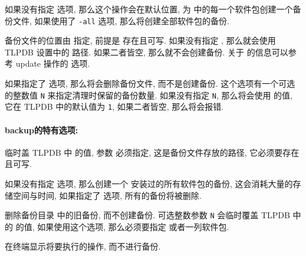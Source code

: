 如果没有指定  选项, 那么这个操作会在默认位置, 为  中的每一个软件包创建一个备份文件, 如果使用了 \texttt{-all} 选项, 那么将创建全部软件包的备份. 

备份文件的位置由   指定, 前提是  存在且可写. 如果没有指定 , 那么就会使用 TLPDB 设置中的  路径. 如果二者皆空, 那么就不会创建备份. 关于  的信息可以参考 \ac{update} 操作的 \hyperlink{op:backup}{} 选项. 

如果指定了  选项, 那么将会删除备份文件, 而不是创建备份. 这个选项有一个可选的整数值 \texttt{N} 来指定清理时保留的备份数量. 如果没有指定 \texttt{N}, 那么将会使用  的值, 它在 TLPDB 中的默认值为 \texttt{1}, 如果二者皆空, 那么将会报错. 

\paragraph{\textmd{\ac{backup}}的特有选项:}
\begin{description}
    \item {} \par
    临时盖 TLPDB 中  的值, 参数  必须指定, 这是备份文件存放的路径, 它必须要存在且可写. 
    \item {}\par
    如果没有指定  选项, 那么创建一个 \tl 安装过的所有软件包的备份, 这会消耗大量的存储空间与时间, 如果指定了  选项, 所有的备份将被删除. 
    \item {}\par
    删除备份目录  中的旧备份, 而不创建备份. 可选整数参数 \texttt{N} 会临时覆盖 TLPDB 中的  的值, 如果使用这个选项, 那么必须要指定  或者一列软件包. 
    \item {}\par
    在终端显示将要执行的操作, 而不进行备份. 
\end{description} 

